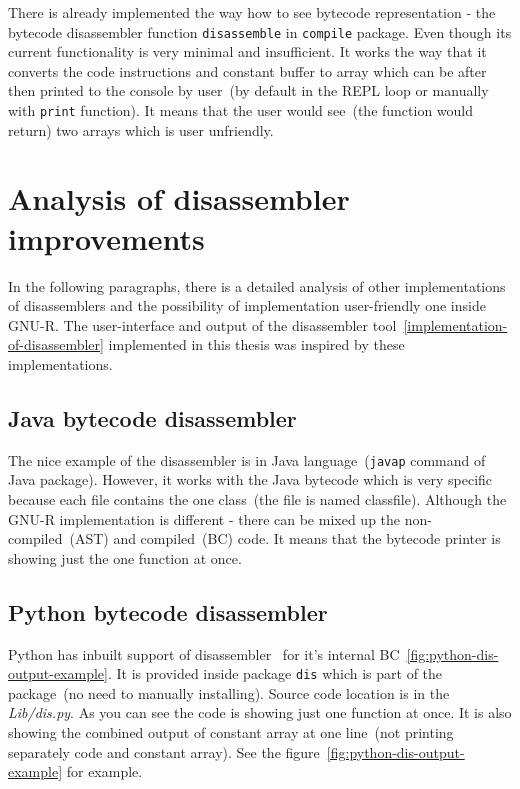 \documentclass[thesis=M,english]{FITthesis}[2018/10/20]
\newcommand{\code}[1]{\texttt{#1}}
\begin{document}
There is already implemented the way how to see bytecode representation - the bytecode disassembler function \code{disassemble} in \code{compile} package. Even though its current functionality is very minimal and insufficient. It works the way that it converts the code instructions and constant buffer to array which can be after then printed to the console by user~(by default in the REPL loop or manually with \code{print} function). It means that the user would see~(the function would return) two arrays which is user unfriendly. 

\section{Analysis of disassembler improvements}\label{analysis-of-disassembler}

In the following paragraphs, there is a detailed analysis of other implementations of disassemblers and the possibility of implementation user-friendly one inside GNU-R. The user-interface and output of the disassembler tool~\ref{implementation-of-disassembler} implemented in this thesis was inspired by these implementations.

\subsection{Java bytecode disassembler}

The nice example of the disassembler is in Java language~(\code{javap} command of Java package). However, it works with the Java bytecode which is very specific because each file contains the one class~(the file is named classfile). Although the GNU-R implementation is different - there can be mixed up the non-compiled~(AST) and compiled~(BC) code. It means that the bytecode printer is showing just the one function at once.

\subsection{Python bytecode disassembler}

Python has inbuilt support of disassembler~\cite{Python-disassembler} for it's internal BC~\ref{fig:python-dis-output-example}. It is provided inside package \code{dis} which is part of the package~(no need to manually installing). Source code location is in the \textit{Lib/dis.py}. As you can see the code is showing just one function at once. It is also showing the combined output of constant array at one line~(not printing separately code and constant array). See the figure~\ref{fig:python-dis-output-example} for example.
\end{document}
